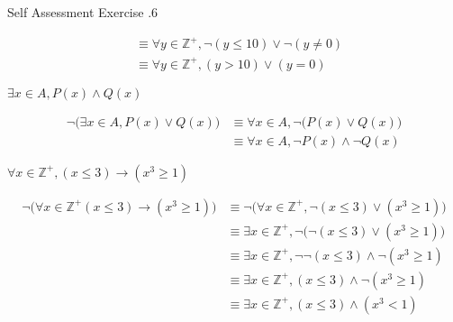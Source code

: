 \documentclass[\main/notes.tex]{subfiles}
\begin{document}
\begin{exercise}{Self Assessment Exercise \thechapter.6}
\begin{questions}
\begin{questions}
\begin{answer}
\begin{align*}
										& \equiv \forall y \in \mathbb{Z}^{+}, \lnot (y \leq 10) \lor \lnot (y \neq 0)\\
										& \equiv \forall y \in \mathbb{Z}^{+}, (y > 10) \lor (y = 0)
									\end{align*}
								\end{answer}
							\item $\exists x \in A, P(x) \land Q(x)$
								\begin{answer}
									\begin{align*}
										\lnot \bigl(\exists x \in A, P(x) \lor Q(x)\bigr) & \equiv \forall x \in A, \lnot \bigl(P(x) \lor Q(x)\bigr)\\
										& \equiv \forall x \in A, \lnot P(x) \land \lnot Q(x)
									\end{align*}
								\end{answer}
							\item $\forall x \in \mathbb{Z}^{+}, (x \leq 3) \rightarrow (x^{3} \geq 1)$
								\begin{answer}
									\begin{align*}
										\lnot \bigl(\forall x \in \mathbb{Z}^{+} (x \leq 3) \rightarrow (x^{3} \geq 1)\bigr) &\equiv \lnot \bigl(\forall x \in \mathbb{Z}^{+}, \lnot (x \leq 3) \lor (x^{3} \geq 1)\bigr)\\
										& \equiv \exists x \in \mathbb{Z}^{+}, \lnot \bigl(\lnot (x \leq 3) \lor (x^{3} \geq 1)\bigr)\\
										& \equiv \exists x \in \mathbb{Z}^{+}, \lnot \lnot (x \leq 3) \land \lnot (x^{3} \geq 1)\\
										& \equiv \exists x \in \mathbb{Z}^{+}, (x \leq 3) \land \lnot (x^{3} \geq 1)\\
										& \equiv \exists x \in \mathbb{Z}^{+}, (x \leq 3) \land (x^{3} < 1)
									\end{align*}
								\end{answer}
						\end{questions}
				\end{questions}
			\end{exercise}
			\pagebreak
\end{document}
